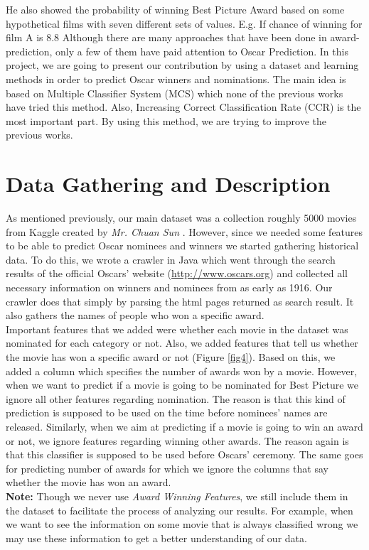 \documentclass[journal,transmag]{IEEEtran}
\begin{document}
He also showed the probability of winning Best Picture Award based on some hypothetical films with seven different sets of values. E.g. If chance of winning for film A is 8.8%
Although there are many approaches that have been done in award-prediction, only a few of them have paid attention to Oscar Prediction. In this project, we are going to present our contribution by using a dataset and learning methods in order to predict Oscar winners and nominations. The main idea is based on Multiple Classifier System (MCS) which none of the previous works have tried this method. Also, Increasing Correct Classification Rate (CCR) is the most important part. By using this method, we are trying to improve the previous works.
	
\section{Data Gathering and Description}
As mentioned previously, our main dataset was a collection roughly 5000 movies from Kaggle created by \emph{Mr. Chuan Sun} \cite{refCreator}. However, since we needed some features to be able to predict Oscar nominees and winners we started gathering historical data. To do this, we wrote a crawler in Java which went through the search results of the official Oscars' website (\url{http://www.oscars.org}) and collected all necessary information on winners and nominees from as early as 1916. Our crawler does that simply by parsing the html pages returned as search result. It also gathers the names of people who won a specific award.\\
Important features that we added were whether each movie in the dataset was nominated for each category or not. Also, we added features that tell us whether the movie has won a specific award or not (Figure \ref{fig4}). Based on this, we added a column which specifies the number of awards won by a movie. However, when we want to predict if a movie is going to be nominated for Best Picture we ignore all other features regarding nomination. The reason is that this kind of prediction is supposed to be used on the time before nominees' names are released. Similarly, when we aim at predicting if a movie is going to win an award or not, we ignore features regarding winning other awards. The reason again is that this classifier is supposed to be used before Oscars' ceremony. The same goes for predicting number of awards for which we ignore the columns that say whether the movie has won an award.\\
\textbf{Note:} Though we never use \emph{Award Winning Features}, we still include them in the dataset to facilitate the process of analyzing our results. For example, when we want to see the information on some movie that is always classified wrong we may use these information to get a better understanding of our data.\\
\end{document}
